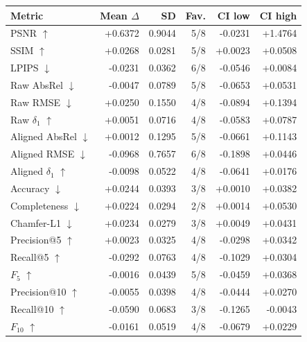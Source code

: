 \begin{tabular}{lrrrrr}
\toprule
Metric & Mean $\Delta$ & SD & Fav. & CI low & CI high \\
\midrule
PSNR $\uparrow$ & +0.6372 & 0.9044 & 5/8 & -0.0231 & +1.4764 \\
SSIM $\uparrow$ & +0.0268 & 0.0281 & 5/8 & +0.0023 & +0.0508 \\
LPIPS $\downarrow$ & -0.0231 & 0.0362 & 6/8 & -0.0546 & +0.0084 \\
Raw AbsRel $\downarrow$ & -0.0047 & 0.0789 & 5/8 & -0.0653 & +0.0531 \\
Raw RMSE $\downarrow$ & +0.0250 & 0.1550 & 4/8 & -0.0894 & +0.1394 \\
Raw $\delta_1$ $\uparrow$ & +0.0051 & 0.0716 & 4/8 & -0.0583 & +0.0787 \\
Aligned AbsRel $\downarrow$ & +0.0012 & 0.1295 & 5/8 & -0.0661 & +0.1143 \\
Aligned RMSE $\downarrow$ & -0.0968 & 0.7657 & 6/8 & -0.1898 & +0.0446 \\
Aligned $\delta_1$ $\uparrow$ & -0.0098 & 0.0522 & 4/8 & -0.0641 & +0.0176 \\
Accuracy $\downarrow$ & +0.0244 & 0.0393 & 3/8 & +0.0010 & +0.0382 \\
Completeness $\downarrow$ & +0.0224 & 0.0294 & 2/8 & +0.0014 & +0.0530 \\
Chamfer-L1 $\downarrow$ & +0.0234 & 0.0279 & 3/8 & +0.0049 & +0.0431 \\
Precision@5 $\uparrow$ & +0.0023 & 0.0325 & 4/8 & -0.0298 & +0.0342 \\
Recall@5 $\uparrow$ & -0.0292 & 0.0763 & 4/8 & -0.1029 & +0.0304 \\
$F_5$ $\uparrow$ & -0.0016 & 0.0439 & 5/8 & -0.0459 & +0.0368 \\
Precision@10 $\uparrow$ & -0.0055 & 0.0398 & 4/8 & -0.0444 & +0.0270 \\
Recall@10 $\uparrow$ & -0.0590 & 0.0683 & 3/8 & -0.1265 & -0.0043 \\
$F_{10}$ $\uparrow$ & -0.0161 & 0.0519 & 4/8 & -0.0679 & +0.0229 \\
\bottomrule
\end{tabular}
